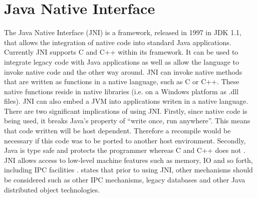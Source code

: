 \documentclass[12pt,a4paper,oneside]{article}
\begin{document}
\section{Java Native Interface}
\begin{spacing}{1.4}
The Java Native Interface (JNI) is a framework, released in 1997 in JDK 1.1, that allows the integration of native code into standard Java applications. Currently JNI supports C and C++ within its framework. It can be used to integrate legacy code with Java applications as well as allow the language to invoke native code and the other way around. JNI can invoke native methods that are written as functions in a native language, such as C or C++. These native functions reside in native libraries (i.e. on a Windows platform as .dll files). JNI can also embed a JVM into applications writen in a native language. There are two significant implications of using JNI. Firstly, since native code is being used, it breaks Java's property of “write once, run anywhere”. This means that code written will be host dependent. Therefore a recompile would be necessary if this code was to be ported to another host environment. Secondly, Java is type safe and protects the programmer whereas C and C++ does not \citep{LiangJNISpecification}. JNI allows access to low-level machine features such as memory, IO and so forth, including IPC facilities \citep{IBM2009}. \cite{LiangJNISpecification} states that prior to using JNI, other mechanisms should be considered such as other IPC mechanisms, legacy databases and other Java distributed object technologies.

\end{spacing}
\end{document}
